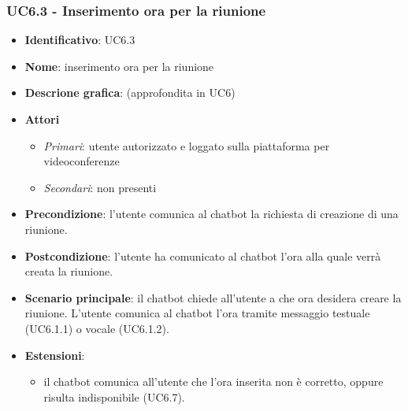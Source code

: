 \subsubsection{UC6.3 - Inserimento ora per la riunione}
\begin{itemize}
    \item \textbf{Identificativo}: UC6.3
    \item \textbf{Nome}: inserimento ora per la riunione
    \item \textbf{Descrione grafica}: (approfondita in UC6)
    \item \textbf{Attori}
 \begin{itemize} 
    \item \textit{Primari}: utente autorizzato e loggato sulla piattaforma per videoconferenze
    \item \textit{Secondari}: non presenti
 \end{itemize}
 \item \textbf{Precondizione}: l'utente comunica al chatbot la richiesta di creazione di una riunione.
 \item \textbf{Postcondizione}: l'utente ha comunicato al chatbot l'ora alla quale verrà creata la riunione.
 \item \textbf{Scenario principale}: il chatbot chiede all'utente a che ora desidera creare la riunione. L'utente comunica al chatbot l'ora tramite messaggio testuale (UC6.1.1) o vocale (UC6.1.2).
 \item \textbf{Estensioni}: 
 \begin{itemize} 
    \item il chatbot comunica all'utente che l'ora inserita non è corretto, oppure risulta indisponibile (UC6.7).
 \end{itemize}
\end{itemize}
